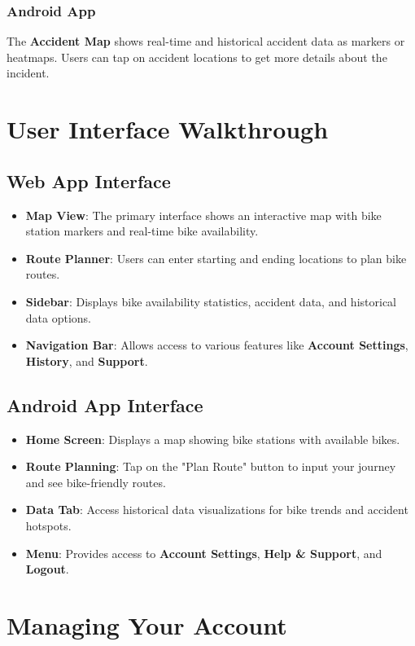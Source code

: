 \documentclass[12pt]{article}
\begin{document}
\subsubsection*{Android App}
The \textbf{Accident Map} shows real-time and historical accident data as markers or heatmaps. Users can tap on accident locations to get more details about the incident.

\section{User Interface Walkthrough}

\subsection{Web App Interface}
\begin{itemize}
    \item \textbf{Map View}: The primary interface shows an interactive map with bike station markers and real-time bike availability.
    \item \textbf{Route Planner}: Users can enter starting and ending locations to plan bike routes.
    \item \textbf{Sidebar}: Displays bike availability statistics, accident data, and historical data options.
    \item \textbf{Navigation Bar}: Allows access to various features like \textbf{Account Settings}, \textbf{History}, and \textbf{Support}.
\end{itemize}

\subsection{Android App Interface}
\begin{itemize}
    \item \textbf{Home Screen}: Displays a map showing bike stations with available bikes.
    \item \textbf{Route Planning}: Tap on the "Plan Route" button to input your journey and see bike-friendly routes.
    \item \textbf{Data Tab}: Access historical data visualizations for bike trends and accident hotspots.
    \item \textbf{Menu}: Provides access to \textbf{Account Settings}, \textbf{Help \& Support}, and \textbf{Logout}.
\end{itemize}

\section{Managing Your Account}
\end{document}
